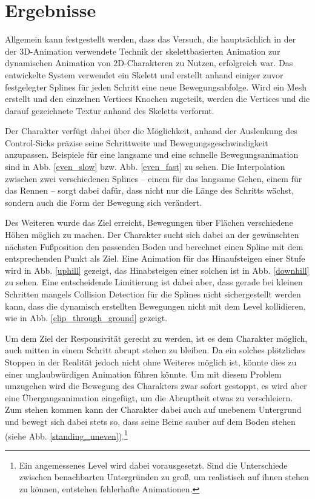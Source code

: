 \chapter{Ergebnisse} \label{ergebnisse}
Allgemein kann festgestellt werden, dass das Versuch, die hauptsächlich in der der 3D-Animation verwendete Technik der skelettbasierten Animation zur dynamischen Animation von 2D-Charakteren zu Nutzen, erfolgreich war. Das entwickelte System verwendet ein Skelett und erstellt anhand einiger zuvor festgelegter Splines für jeden Schritt eine neue Bewegungsabfolge. Wird ein Mesh erstellt und den einzelnen Vertices Knochen zugeteilt, werden die Vertices und die darauf gezeichnete Textur anhand des Skeletts verformt.

Der Charakter verfügt dabei über die Möglichkeit, anhand der Auslenkung des Control-Sicks präzise seine Schrittweite und Bewegungsgeschwindigkeit anzupassen. Beispiele für eine langsame und eine schnelle Bewegungsanimation sind in Abb. \ref{even_slow} bzw. Abb. \ref{even_fast} zu sehen. Die Interpolation zwischen zwei verschiedenen Splines -- einem für das langsame Gehen, einem für das Rennen -- sorgt dabei dafür, dass nicht nur die Länge des Schritts wächst, sondern auch die Form der Bewegung sich verändert.

Des Weiteren wurde das Ziel erreicht, Bewegungen über Flächen verschiedene Höhen möglich zu machen. Der Charakter sucht sich dabei an der gewünschten nächsten Fußposition den passenden Boden und berechnet einen Spline mit dem entsprechenden Punkt als Ziel. Eine Animation für das Hinaufsteigen einer Stufe wird in Abb. \ref{uphill} gezeigt, das Hinabsteigen einer solchen ist in Abb. \ref{downhill} zu sehen. Eine entscheidende Limitierung ist dabei aber, dass gerade bei kleinen Schritten mangels Collision Detection für die Splines nicht sichergestellt werden kann, dass die dynamisch erstellten Bewegungen nicht mit dem Level kollidieren, wie in Abb. \ref{clip_through_ground} gezeigt.

Um dem Ziel der Responsivität gerecht zu werden, ist es dem Charakter möglich, auch mitten in einem Schritt abrupt stehen zu bleiben. Da ein solches plötzliches Stoppen in der Realität jedoch nicht ohne Weiteres möglich ist, könnte dies zu einer unglaubwürdigen Animation führen könnte. Um mit diesem Problem umzugehen wird die Bewegung des Charakters zwar sofort gestoppt, es wird aber eine Übergangsanimation eingefügt, um die Abruptheit etwas zu verschleiern. Zum stehen kommen kann der Charakter dabei auch auf unebenem Untergrund und bewegt sich dabei stets so, dass seine Beine sauber auf dem Boden stehen (siehe Abb. \ref{standing_uneven}).\footnote{Ein angemessenes Level wird dabei vorausgesetzt. Sind die Unterschiede zwischen benachbarten Untergründen zu groß, um realistisch auf ihnen stehen zu können, entstehen fehlerhafte Animationen.}


